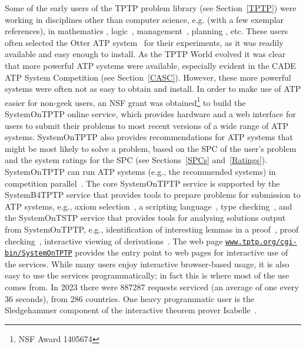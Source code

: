 \documentclass{easychair}
\begin{document}
Some of the early users of the TPTP problem library (see Section~\ref{TPTP}) were working in
disciplines other than computer science, e.g. (with a few exemplar references), in mathematics 
\cite{Qua92-Book,MP96}, logic~\cite{GO86,Jec95}, management~\cite{PB+92-TR,PM94}, planning 
\cite{SE94}, etc. 
These users often selected the Otter ATP system~\cite{McC03-Otter} for their experiments, as
it was readily available and easy enough to install. 
As the TPTP World evolved it was clear that more powerful ATP systems were available, especially 
evident in the CADE ATP System Competition (see Section~\ref{CASC}).
However, these more powerful systems were often not as easy to obtain and install.
In order to make use of ATP easier for non-geek users, an NSF grant was obtained\footnote{%
NSF Award 1405674} to build the SystemOnTPTP online service, which provides hardware and a web 
interface for users to submit their problems to most recent versions of a wide range of ATP 
systems.
SystemOnTPTP also provides recommendations for ATP systems that might be most likely to solve
a problem, based on the SPC of the user's problem and the system ratings for the SPC
(see Sections~\ref{SPCs} and~\ref{Ratings}). 
SystemOnTPTP can run ATP systems (e.g., the recommended systems) in competition
parallel~\cite{SS99-FLAIRS}.
The core SystemOnTPTP service is supported by the SystemB4TPTP service that provides tools to
prepare problems for submission to ATP systems, e.g., axiom selection~\cite{HV11}, a scripting
language~\cite{Sut14}, type checking~\cite{KSR16}, and the SystemOnTSTP service that provides 
tools for analysing solutions output from SystemOnTPTP, 
e.g., identification of interesting lemmas in a proof~\cite{PGS06}, proof checking~\cite{Sut06},
interactive viewing of derivations~\cite{TPS07}.
The web page 
\href{https://www.tptp.org/cgi-bin/SystemOnTPTP}{{\tt www.tptp.org/cgi-bin/SystemOnTPTP}} 
provides the entry point to web pages for interactive use of the services.
While many users enjoy interactive browser-based usage, it is also easy to use the services 
programmatically; in fact this is where most of the use comes from.
In 2023 there were 887287 requests serviced (an average of one every 36 seconds), from 286 
countries.
One heavy programmatic user is the Sledgehammer component of the interactive theorem prover
Isabelle~\cite{PB10}.
\end{document}

